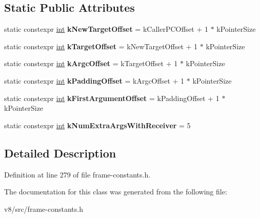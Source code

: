 \subsection*{Static Public Attributes}
\begin{DoxyCompactItemize}
\item 
\mbox{\label{classv8_1_1internal_1_1BuiltinExitFrameConstants_a0b5dbc731adbf30e5269cc5758bc4be8}} 
static constexpr \mbox{\hyperlink{classint}{int}} {\bfseries k\+New\+Target\+Offset} = k\+Caller\+P\+C\+Offset + 1 $\ast$ k\+Pointer\+Size
\item 
\mbox{\label{classv8_1_1internal_1_1BuiltinExitFrameConstants_a4e6f705b3515bad1c8e26f93e48565f3}} 
static constexpr \mbox{\hyperlink{classint}{int}} {\bfseries k\+Target\+Offset} = k\+New\+Target\+Offset + 1 $\ast$ k\+Pointer\+Size
\item 
\mbox{\label{classv8_1_1internal_1_1BuiltinExitFrameConstants_af791a3e096314ee32a0da839aa20e9f8}} 
static constexpr \mbox{\hyperlink{classint}{int}} {\bfseries k\+Argc\+Offset} = k\+Target\+Offset + 1 $\ast$ k\+Pointer\+Size
\item 
\mbox{\label{classv8_1_1internal_1_1BuiltinExitFrameConstants_aca0cdf12c978f0bc7b448076c8e84351}} 
static constexpr \mbox{\hyperlink{classint}{int}} {\bfseries k\+Padding\+Offset} = k\+Argc\+Offset + 1 $\ast$ k\+Pointer\+Size
\item 
\mbox{\label{classv8_1_1internal_1_1BuiltinExitFrameConstants_a075cbcaeac212c83c431c123bda9caac}} 
static constexpr \mbox{\hyperlink{classint}{int}} {\bfseries k\+First\+Argument\+Offset} = k\+Padding\+Offset + 1 $\ast$ k\+Pointer\+Size
\item 
\mbox{\label{classv8_1_1internal_1_1BuiltinExitFrameConstants_ada35b9cd2ab211aee518a85c5d18f222}} 
static constexpr \mbox{\hyperlink{classint}{int}} {\bfseries k\+Num\+Extra\+Args\+With\+Receiver} = 5
\end{DoxyCompactItemize}


\subsection{Detailed Description}


Definition at line 279 of file frame-\/constants.\+h.



The documentation for this class was generated from the following file\+:\begin{DoxyCompactItemize}
\item 
v8/src/frame-\/constants.\+h\end{DoxyCompactItemize}
